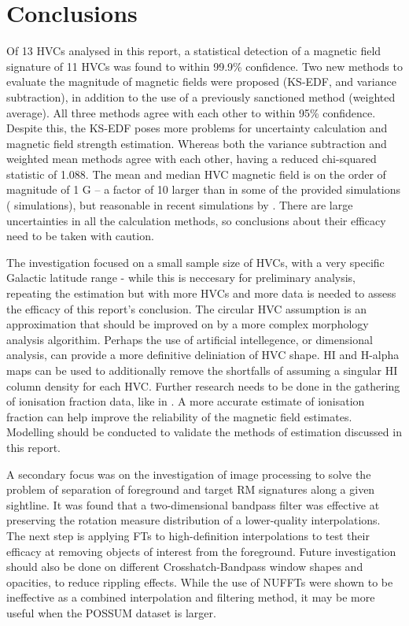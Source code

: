 \chapter{Conclusions}
\label{cha:conclusion}

Of 13 HVCs analysed in this report, a statistical detection of a magnetic field signature of 11 HVCs was found to within 99.9\% confidence. Two new methods to evaluate the magnitude of magnetic fields were proposed (KS-EDF, and variance subtraction), in addition to the use of a previously sanctioned method (weighted average). All three methods agree with each other to within 95\% confidence. Despite this, the KS-EDF poses more problems for uncertainty calculation and magnetic field strength estimation. Whereas both the variance subtraction and weighted mean methods agree with each other, having a reduced chi-squared statistic of 1.088. The mean and median HVC magnetic field is on the order of magnitude of 1 \textmu G – a factor of 10 larger than in some of the provided simulations (\citeauthor{ID23} simulations), but reasonable in recent simulations by \cite{ID34}. There are large uncertainties in all the calculation methods, so conclusions about their efficacy need to be taken with caution.


The investigation focused on a small sample size of HVCs, with a very specific Galactic latitude range - while this is neccesary for preliminary analysis, repeating the estimation but with more HVCs and more data is needed to assess the efficacy of this report's conclusion. The circular HVC assumption is an approximation that should be improved on by a more complex morphology analysis algorithim. Perhaps the use of artificial intellegence, or dimensional analysis, can provide a more definitive deliniation of HVC shape. HI and H-alpha maps can be used to additionally remove the shortfalls of assuming a singular HI column density for each HVC. Further research needs to be done in the gathering of ionisation fraction data, like in \cite{ID67}. A more accurate estimate of ionisation fraction can help improve the reliability of the magnetic field estimates. Modelling should be conducted to validate the methods of estimation discussed in this report.


A secondary focus was on the investigation of image processing to solve the problem of separation of foreground and target RM signatures along a given sightline. It was found that a two-dimensional bandpass filter was effective at preserving the rotation measure distribution of a lower-quality interpolations. The next step is applying FTs to high-definition interpolations to test their efficacy at removing objects of interest from the foreground. Future investigation should also be done on different Crosshatch-Bandpass window shapes and opacities, to reduce rippling effects. While the use of NUFFTs were shown to be ineffective as a combined interpolation and filtering method, it may be more useful when the POSSUM dataset is larger.

